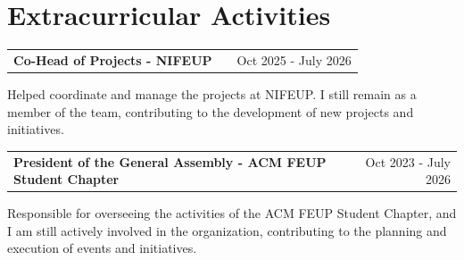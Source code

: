 \documentclass[a4paper,11pt]{article}
\makeatletter
\newenvironment{jobshort}[2]
    {
    \begin{tabularx}{\linewidth}{@{}l X r@{}}
    \textbf{#1} & \hfill &  #2 \\[3.75pt]
    \end{tabularx}
    }
    {
    }
\makeatother
\begin{document}





\section{Extracurricular Activities}

\begin{jobshort}{Co-Head of Projects - NIFEUP}{Oct 2025 - July 2026}
Helped coordinate and manage the projects at NIFEUP. I still remain as a member of the team, contributing to the development of new projects and initiatives.
\end{jobshort}

\begin{jobshort}{President of the General Assembly - ACM FEUP Student Chapter}{Oct 2023 - July 2026}
Responsible for overseeing the activities of the ACM FEUP Student Chapter, and I am still actively involved in the organization, contributing to the planning and execution of events and initiatives.
\end{jobshort}


\end{document}

